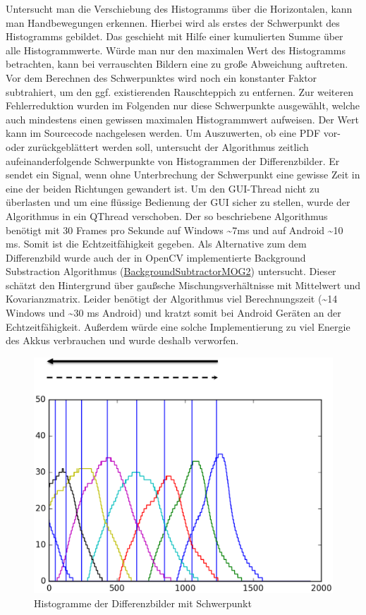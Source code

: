 Untersucht man die Verschiebung des Histogramms über die Horizontalen, kann man Handbewegungen erkennen. Hierbei wird als erstes der Schwerpunkt des Histogramms gebildet. Das geschieht mit Hilfe einer kumulierten Summe über alle Histogrammwerte. Würde man nur den maximalen Wert des Histogramms betrachten, kann bei verrauschten Bildern eine zu große Abweichung auftreten. Vor dem Berechnen des Schwerpunktes wird noch ein konstanter Faktor subtrahiert, um den ggf. existierenden Rauschteppich zu entfernen. Zur weiteren Fehlerreduktion wurden im Folgenden nur diese Schwerpunkte ausgewählt, welche auch mindestens einen gewissen maximalen Histogrammwert aufweisen. Der Wert kann im Sourcecode nachgelesen werden. Um Auszuwerten, ob eine PDF vor- oder zurückgeblättert werden soll, untersucht der Algorithmus zeitlich aufeinanderfolgende Schwerpunkte von Histogrammen der Differenzbilder. Er sendet ein Signal, wenn ohne Unterbrechung der Schwerpunkt eine gewisse Zeit in eine der beiden Richtungen gewandert ist. Um den GUI-Thread nicht zu überlasten und um eine flüssige Bedienung der GUI sicher zu stellen, wurde der Algorithmus in ein QThread verschoben. Der so beschriebene Algorithmus benötigt mit 30 Frames pro Sekunde auf Windows \textasciitilde 7ms und auf Android \textasciitilde 10 ms. Somit ist die Echtzeitfähigkeit gegeben. Als Alternative zum dem Differenzbild wurde auch der in OpenCV implementierte Background Substraction Algorithmus (\href{http://docs.opencv.org/3.0-rc1/d7/d7b/classcv_1_1BackgroundSubtractorMOG2.html}{BackgroundSubtractorMOG2}) untersucht. Dieser schätzt den Hintergrund über gaußsche Mischungsverhältnisse mit Mittelwert und Kovarianzmatrix. Leider benötigt der Algorithmus viel Berechnungszeit (\textasciitilde 14 Windows und \textasciitilde 30 ms Android) und kratzt somit bei Android Geräten an der Echtzeitfähigkeit. Außerdem würde eine solche Implementierung zu viel Energie des Akkus verbrauchen und wurde deshalb verworfen.

\begin{figure}[ht!]
\centering
\includegraphics[width=\textwidth]{handcontrol/Bilder/histogramm_schwerpunkt.png}
\caption{Histogramme der Differenzbilder mit Schwerpunkt}
\end{figure}


